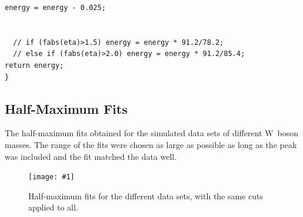 \documentclass[twocolumn]{article}
\newcommand{\insertFigure}[1]{%
   \texttt{[image: \#1]}%
}
\begin{document}
\begin{lstlisting}
energy = energy - 0.025;


  // if (fabs(eta)>1.5) energy = energy * 91.2/78.2;
  // else if (fabs(eta)>2.0) energy = energy * 91.2/85.4;
return energy;
} 
\end{lstlisting}
\newpage
\subsection{Half-Maximum Fits} \label{sec:half}
The half-maximum fits obtained for the simulated data sets of different W~boson masses. The range of the fits were chosen as large as possible as long as the peak was included and the fit matched the data well.
\begin{figure}[!h]
	\centering
	\insertFigure{Images/GaugeCurves.png}
	\caption{Half-maximum fits for the different data sets, with the same cuts applied to all.}
	\label{fig:gauge}
\end{figure}

\newpage
\end{document}
